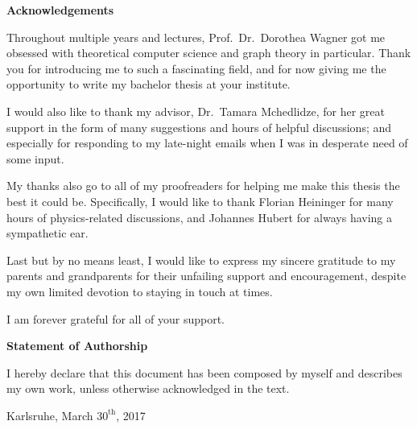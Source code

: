 \thispagestyle{plain}

\centerline{\textbf{Acknowledgements}}
\vspace{0.25cm}

Throughout multiple years and lectures, {Prof.~Dr.~Dorothea Wagner} got me obsessed with theoretical computer science and graph theory in particular. Thank you for introducing me to such a fascinating field, and for now giving me the opportunity to write my bachelor thesis at your institute.

I would also like to thank my advisor, {Dr.~Tamara Mchedlidze}, for her great support in the form of many suggestions and hours of helpful discussions; and especially for responding to my late-night emails when I was in desperate need of some input.

My thanks also go to all of my proofreaders for helping me make this thesis the best it could be. Specifically, I would like to thank {Florian Heininger} for many hours of physics-related discussions, and {Johannes Hubert} for always having a sympathetic ear.

Last but by no means least, I would like to express my sincere gratitude to my parents and grandparents for their unfailing support and encouragement, despite my own limited devotion to staying in touch at times.

I am forever grateful for all of your support.

\vspace*{\fill}



\centerline{\textbf{Statement of Authorship}}
\vspace{0.25cm}

I hereby declare that this document has been composed by myself and describes my own work, unless otherwise acknowledged in the text.

\vspace{2.5cm}

\noindent
\makebox[7.5cm]{\hrulefill}

\hspace{0.25cm}
Karlsruhe, March $30^\text{th}$, 2017

\vspace{2cm}
